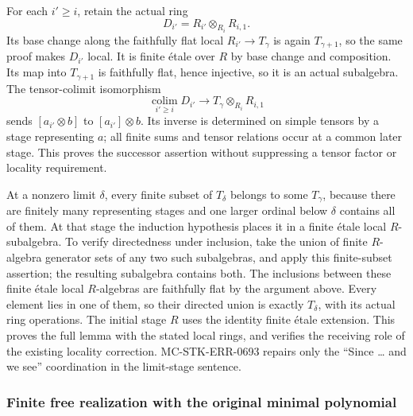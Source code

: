 For each \(i'\geq i\), retain the actual ring \[
 D_{i'}=R_{i'}\otimes_{R_i}R_{i,1}.
\] Its base change along the faithfully flat local \(R_{i'}\to T_\gamma\) is again \(T_{\gamma+1}\), so the same proof makes \(D_{i'}\) local. It is finite étale over \(R\) by base change and composition. Its map into \(T_{\gamma+1}\) is faithfully flat, hence injective, so it is an actual subalgebra. The tensor-colimit isomorphism \[
 \operatorname*{colim}_{i'\geq i}D_{i'}
      \longrightarrow T_\gamma\otimes_{R_i}R_{i,1}
\] sends \([a_{i'}\otimes b]\) to \([a_{i'}]\otimes b\). Its inverse is determined on simple tensors by a stage representing \(a\); all finite sums and tensor relations occur at a common later stage. This proves the successor assertion without suppressing a tensor factor or locality requirement.

At a nonzero limit \(\delta\), every finite subset of \(T_\delta\) belongs to some \(T_\gamma\), because there are finitely many representing stages and one larger ordinal below \(\delta\) contains all of them. At that stage the induction hypothesis places it in a finite étale local \(R\)-subalgebra. To verify directedness under inclusion, take the union of finite \(R\)-algebra generator sets of any two such subalgebras, and apply this finite-subset assertion; the resulting subalgebra contains both. The inclusions between these finite étale local \(R\)-algebras are faithfully flat by the argument above. Every element lies in one of them, so their directed union is exactly \(T_\delta\), with its actual ring operations. The initial stage \(R\) uses the identity finite étale extension. This proves the full lemma with the stated local rings, and verifies the receiving role of the existing locality correction. MC-\AlgebraIdentifierBreak{}STK-\AlgebraIdentifierBreak{}ERR-\AlgebraIdentifierBreak{}0693 repairs only the ``Since \ldots{} and we see'' coordination in the limit-stage sentence.

\subsubsection{Finite free realization with the original minimal polynomial}\label{algebra-proof-064-finite-free-realization-with-the-original-minimal-polynomial}

